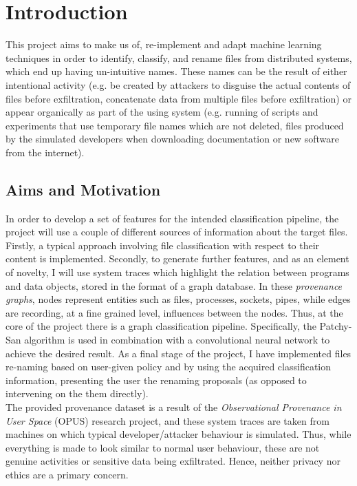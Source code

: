 

\chapter{Introduction}

This project aims to make us of, re-implement and adapt machine learning techniques in order to identify, classify, and rename files from distributed systems, which end up having un-intuitive names. These names can be the result of either intentional activity (e.g. be created by attackers to disguise the actual contents of files before exfiltration, concatenate data from multiple files before exfiltration) or appear organically as part of the using system (e.g. running of scripts and experiments that use temporary file names which are not deleted, files produced by the simulated developers when downloading documentation or new software from the internet). \\


\section{Aims and Motivation}  \label{1.1}

In order to develop a set of features for the intended classification pipeline, the project will use a couple of different sources of information about the target files. Firstly, a typical approach involving file classification with respect to their content is implemented. Secondly, to generate further features, and as an element of novelty, I will use system traces which highlight the relation between programs and data objects, stored in the format of a graph database. In these \textit{provenance graphs}, nodes represent entities such as files, processes, sockets, pipes, while edges are recording, at a fine grained level, influences between the nodes. Thus, at the core of the project there is a graph classification pipeline. Specifically, the Patchy-San algorithm is used in combination with a convolutional neural network to achieve the desired result. As a final stage of the project, I have implemented files re-naming based on user-given policy and by using the acquired classification information, presenting the user the renaming proposals (as opposed to intervening on the them directly). \\

The provided provenance dataset is a result of the \textit{Observational Provenance in User Space} (OPUS) research project, and these system traces are taken from machines on which typical developer/attacker behaviour is simulated. Thus, while everything is made to look similar to normal user behaviour, these are not genuine activities or sensitive data being exfiltrated. Hence, neither privacy nor ethics are a primary concern. \\

